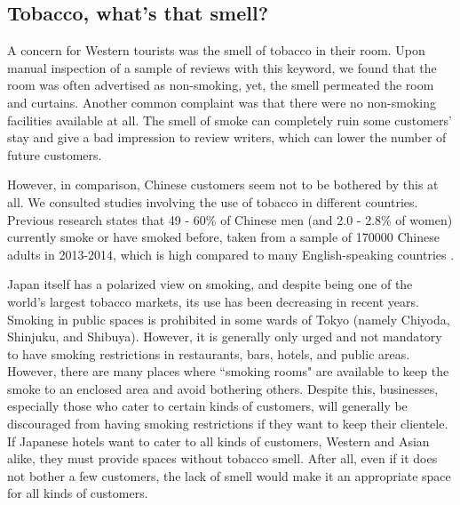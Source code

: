 \subsection{Tobacco, what's that smell?}\label{disc:tobacco}

A concern for Western tourists was the smell of tobacco in their room. Upon manual inspection of a sample of reviews with this keyword, we found that the room was often advertised as non-smoking, yet, the smell permeated the room and curtains. Another common complaint was that there were no non-smoking facilities available at all. The smell of smoke can completely ruin some customers' stay and give a bad impression to review writers, which can lower the number of future customers. 

However, in comparison, Chinese customers seem not to be bothered by this at all. We consulted studies involving the use of tobacco in different countries. Previous research states that 49 - 60\% of Chinese men (and 2.0 - 2.8\% of women) currently smoke or have smoked before, taken from a sample of \num[group-separator={,}]{170000} Chinese adults in 2013-2014, which is high compared to many English-speaking countries \cite[][]{zhang2019tobacco, who2015tobacco}.

Japan itself has a polarized view on smoking, and despite being one of the world's largest tobacco markets, its use has been decreasing in recent years. Smoking in public spaces is prohibited in some wards of Tokyo (namely Chiyoda, Shinjuku, and Shibuya). However, it is generally only urged and not mandatory to have smoking restrictions in restaurants, bars, hotels, and public areas. However, there are many places where ``smoking rooms" are available to keep the smoke to an enclosed area and avoid bothering others. Despite this, businesses, especially those who cater to certain kinds of customers, will generally be discouraged from having smoking restrictions if they want to keep their clientele. If Japanese hotels want to cater to all kinds of customers, Western and Asian alike, they must provide spaces without tobacco smell. After all, even if it does not bother a few customers, the lack of smell would make it an appropriate space for all kinds of customers. 

